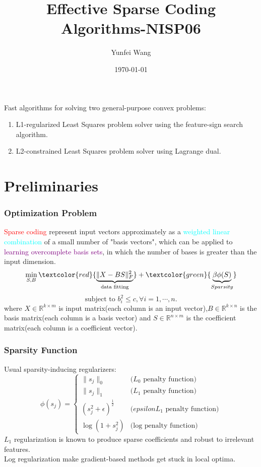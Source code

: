 \documentclass{beamer}
\title{Effective Sparse Coding Algorithms-NISP06}
\author{Yunfei Wang}
\institute{Department of Computer Science \& Technology \\Huazhong University of Science \& Technology}
\date{\today}
\begin{document}
\begin{frame}
\titlepage
\end{frame}

\begin{frame}
\tableofcontents
\end{frame}

\begin{frame}
Fast algorithms for solving two general-purpose convex problems:
\begin{enumerate}
\item L1-regularized Least Squares problem solver using the feature-sign search algorithm.
\item L2-constrained Least Squares problem solver using Lagrange dual.
\end{enumerate}
\end{frame}


\section{Preliminaries}
\begin{frame}\frametitle{Optimization Problem}
\textcolor{red}{Sparse coding} represent input vectors approximately as a \textcolor{cyan}{weighted linear combination} of a small number of "basis vectors", which can be applied to \textcolor{purple}{learning overcomplete basis sets}, in which the number of bases is greater than the input dimension.
\begin{equation}\label{eq:obj}
\min_{S,B}\textcolor{red}{\underbrace{\|X-BS\|_F^2}_{\text{data fitting}}}+\textcolor{green}{\underbrace{\beta\phi(S)}_{Sparsity}}
\end{equation}
\[\text{subject to }b_i^2\leq c,\forall i=1,\cdots,n.\]
where $X\in \mathbb{R}^{k\times m}$ is input matrix(each column is an input vector),$B\in \mathbb{R}^{k\times n}$ is the basis matrix(each column is a basis vector) and $S\in \mathbb{R}^{n\times m}$ is the coefficient matrix(each column is a coefficient vector).
\end{frame}

\begin{frame}\frametitle{Sparsity Function}
Usual sparsity-inducing regularizers:
\begin{equation}\label{eq:sparsityfun}
\phi(s_j)=
\begin{cases}
\|s_j\|_0 &\text{($L_0$ penalty function)}\\
\|s_j\|_1 &\text{($L_1$ penalty function)}\\
(s_j^2+\epsilon)^{\frac{1}{2}} &\text{($epsilonL_1$ penalty function)}\\
\log(1+s_j^2) &\text{(log penalty function)}
\end{cases}
\end{equation}
$L_1$ regularization is known to produce sparse coefficients and robust to irrelevant features.\\
Log regularization make gradient-based methods get stuck in local optima.
\end{frame}
\end{document}

